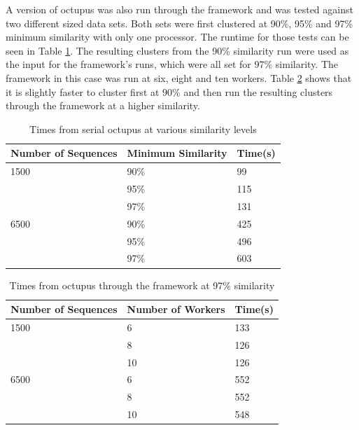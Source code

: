 \documentclass[12pt]{article}
\begin{document}
A version of octupus was also run through the framework and was tested against
two different sized data sets. Both sets were first clustered at 90\%, 95\% and
97\% minimum similarity with only one processor. The runtime for those tests can
be seen in Table \ref{tab:octu1}. The resulting clusters from the 90\%
similarity run were used as the input for the framework's runs, which were all
set for 97\% similarity.  The framework in this case was run at six, eight and
ten workers. Table \ref{tab:octu2} shows that it is slightly faster to cluster
first at 90\% and then run the resulting clusters through the framework at a
higher similarity. 

\begin{table}
    \begin{center}
    \begin{tabular}{|l|l|l|}
    \hline
        Number of Sequences & Minimum Similarity & Time(s) \\ \hline
        1500                & 90\%               & 99      \\
        ~                   & 95\%               & 115     \\
        ~                   & 97\%               & 131     \\ \hline
        6500                & 90\%               & 425     \\
        ~                   & 95\%               & 496     \\
        ~                   & 97\%               & 603     \\ \hline
    \end{tabular}
    \caption{Times from serial octupus at various similarity levels}
    \label{tab:octu1}
    \end{center}
\end{table}

\begin{table}
    \begin{center}
    \begin{tabular}{|l|l|l|}
        \hline
        Number of Sequences & Number of Workers & Time(s) \\ \hline
        1500                & 6                 & 133      \\
        ~                   & 8                 & 126      \\
        ~                   & 10                & 126      \\ \hline
        6500                & 6                 & 552     \\
        ~                   & 8                 & 552     \\
        ~                   & 10                & 548     \\ \hline
    \end{tabular}
    \caption{Times from octupus through the framework at 97\% similarity}
    \label{tab:octu2}
    \end{center}
\end{table}
\end{document}
